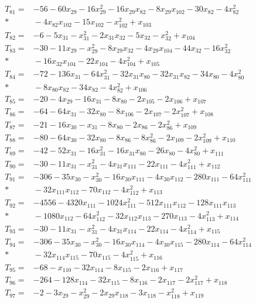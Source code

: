 \begin{align*}
T_{81}={}&-56-60x_{29}-16x_{29}^{2}-16x_{29}x_{82}-8x_{29}x_{102}-30x_{82}-4x_{82}^{2}\\*
&{}-4x_{82}x_{102}-15x_{102}-x_{102}^{2}+x_{103}\\[3pt]
T_{82}={}&-6-5x_{31}-x_{31}^{2}-2x_{31}x_{32}-5x_{32}-x_{32}^{2}+x_{104}\\[3pt]
T_{83}={}&-30-11x_{29}-x_{29}^{2}-8x_{29}x_{32}-4x_{29}x_{104}-44x_{32}-16x_{32}^{2}\\*
&{}-16x_{32}x_{104}-22x_{104}-4x_{104}^{2}+x_{105}\\[3pt]
T_{84}={}&-72-136x_{31}-64x_{31}^{2}-32x_{31}x_{80}-32x_{31}x_{82}-34x_{80}-4x_{80}^{2}\\*
&{}-8x_{80}x_{82}-34x_{82}-4x_{82}^{2}+x_{106}\\[3pt]
T_{85}={}&-20-4x_{29}-16x_{31}-8x_{80}-2x_{105}-2x_{106}+x_{107}\\[3pt]
T_{86}={}&-64-64x_{31}-32x_{80}-8x_{106}-2x_{107}-2x_{107}^{2}+x_{108}\\[3pt]
T_{87}={}&-21-16x_{30}-x_{31}-8x_{80}-2x_{86}-2x_{86}^{2}+x_{109}\\[3pt]
T_{88}={}&-80-64x_{30}-32x_{80}-8x_{86}-8x_{86}^{2}-2x_{109}-2x_{109}^{2}+x_{110}\\[3pt]
T_{89}={}&-42-52x_{31}-16x_{31}^{2}-16x_{31}x_{80}-26x_{80}-4x_{80}^{2}+x_{111}\\[3pt]
T_{90}={}&-30-11x_{31}-x_{31}^{2}-4x_{31}x_{111}-22x_{111}-4x_{111}^{2}+x_{112}\\[3pt]
T_{91}={}&-306-35x_{30}-x_{30}^{2}-16x_{30}x_{111}-4x_{30}x_{112}-280x_{111}-64x_{111}^{2}\\*
&{}-32x_{111}x_{112}-70x_{112}-4x_{112}^{2}+x_{113}\\[3pt]
T_{92}={}&-4556-4320x_{111}-1024x_{111}^{2}-512x_{111}x_{112}-128x_{111}x_{113}\\*
&{}-1080x_{112}-64x_{112}^{2}-32x_{112}x_{113}-270x_{113}-4x_{113}^{2}+x_{114}\\[3pt]
T_{93}={}&-30-11x_{31}-x_{31}^{2}-4x_{31}x_{114}-22x_{114}-4x_{114}^{2}+x_{115}\\[3pt]
T_{94}={}&-306-35x_{30}-x_{30}^{2}-16x_{30}x_{114}-4x_{30}x_{115}-280x_{114}-64x_{114}^{2}\\*
&{}-32x_{114}x_{115}-70x_{115}-4x_{115}^{2}+x_{116}\\[3pt]
T_{95}={}&-68-x_{110}-32x_{114}-8x_{115}-2x_{116}+x_{117}\\[3pt]
T_{96}={}&-264-128x_{114}-32x_{115}-8x_{116}-2x_{117}-2x_{117}^{2}+x_{118}\\[3pt]
T_{97}={}&-2-3x_{29}-x_{29}^{2}-2x_{29}x_{118}-3x_{118}-x_{118}^{2}+x_{119}\\[3pt]

\end{align*}

